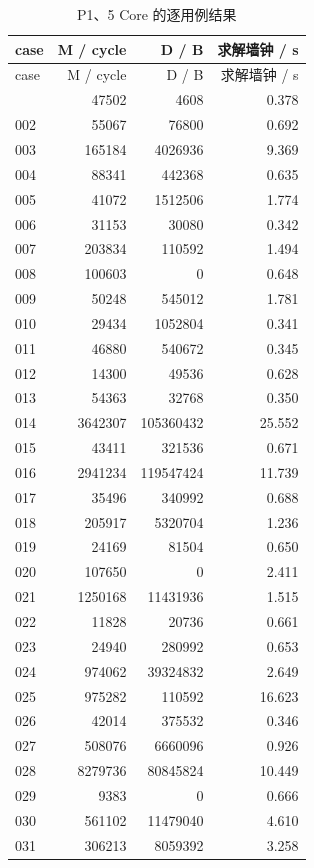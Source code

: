 \documentclass[anonymous,notoc]{gmcm2026}
\begin{document}
\begin{longtable}{lrrr}
\caption{P1、5 Core 的逐用例结果}\\
\toprule
case & M / cycle & D / B & 求解墙钟 / s\\\midrule
\endfirsthead
\toprule
case & M / cycle & D / B & 求解墙钟 / s\\\midrule
\endhead
\bottomrule\endfoot
001 & 47502 & 4608 & 0.378 \\
002 & 55067 & 76800 & 0.692 \\
003 & 165184 & 4026936 & 9.369 \\
004 & 88341 & 442368 & 0.635 \\
005 & 41072 & 1512506 & 1.774 \\
006 & 31153 & 30080 & 0.342 \\
007 & 203834 & 110592 & 1.494 \\
008 & 100603 & 0 & 0.648 \\
009 & 50248 & 545012 & 1.781 \\
010 & 29434 & 1052804 & 0.341 \\
011 & 46880 & 540672 & 0.345 \\
012 & 14300 & 49536 & 0.628 \\
013 & 54363 & 32768 & 0.350 \\
014 & 3642307 & 105360432 & 25.552 \\
015 & 43411 & 321536 & 0.671 \\
016 & 2941234 & 119547424 & 11.739 \\
017 & 35496 & 340992 & 0.688 \\
018 & 205917 & 5320704 & 1.236 \\
019 & 24169 & 81504 & 0.650 \\
020 & 107650 & 0 & 2.411 \\
021 & 1250168 & 11431936 & 1.515 \\
022 & 11828 & 20736 & 0.661 \\
023 & 24940 & 280992 & 0.653 \\
024 & 974062 & 39324832 & 2.649 \\
025 & 975282 & 110592 & 16.623 \\
026 & 42014 & 375532 & 0.346 \\
027 & 508076 & 6660096 & 0.926 \\
028 & 8279736 & 80845824 & 10.449 \\
029 & 9383 & 0 & 0.666 \\
030 & 561102 & 11479040 & 4.610 \\
031 & 306213 & 8059392 & 3.258 \\

\end{longtable}
\end{document}
